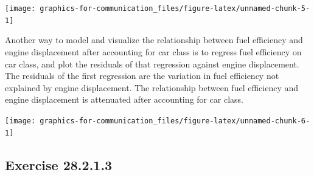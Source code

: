 \documentclass[]{book}
\newenvironment{Shaded}{\begin{snugshade}}{\end{snugshade}}
\newcommand{\DataTypeTok}[1]{\textcolor[rgb]{0.13,0.29,0.53}{#1}}
\newcommand{\KeywordTok}[1]{\textcolor[rgb]{0.13,0.29,0.53}{\textbf{#1}}}
\newcommand{\NormalTok}[1]{#1}
\newcommand{\OperatorTok}[1]{\textcolor[rgb]{0.81,0.36,0.00}{\textbf{#1}}}
\newcommand{\OtherTok}[1]{\textcolor[rgb]{0.56,0.35,0.01}{#1}}
\newcommand{\StringTok}[1]{\textcolor[rgb]{0.31,0.60,0.02}{#1}}
\theoremstyle{plain}
\theoremstyle{remark}
\begin{document}
\begin{center}\texttt{[image: graphics-for-communication\_files/figure-latex/unnamed-chunk-5-1]} \end{center}

Another way to model and visualize the relationship between fuel efficiency
and engine displacement after accounting for car class is to regress
fuel efficiency on car class, and plot the residuals of that regression against
engine displacement.
The residuals of the first regression are the variation in fuel efficiency
not explained by engine displacement.
The relationship between fuel efficiency and engine displacement is attenuated
after accounting for car class.

\begin{Shaded}
\end{Shaded}

\begin{center}\texttt{[image: graphics-for-communication\_files/figure-latex/unnamed-chunk-6-1]} \end{center}

\hypertarget{exercise-28.2.1.3}{%
\subsection*{\texorpdfstring{Exercise {28.2.1.3}}{Exercise 28.2.1.3}}\label{exercise-28.2.1.3}}
\end{document}
